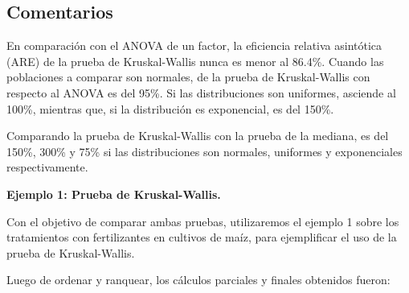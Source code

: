 \documentclass[]{book}
\theoremstyle{definition}
\theoremstyle{definition}
\theoremstyle{definition}
\theoremstyle{remark}
\begin{document}
\hypertarget{comentarios-3}{%
\subsection{Comentarios}\label{comentarios-3}}

En comparación con el ANOVA de un factor, la eficiencia relativa
asintótica (ARE) de la prueba de Kruskal-Wallis nunca es menor al
86.4\%. Cuando las poblaciones a comparar son normales, de la prueba de
Kruskal-Wallis con respecto al ANOVA es del 95\%. Si las distribuciones
son uniformes, asciende al 100\%, mientras que, si la distribución es
exponencial, es del 150\%.

Comparando la prueba de Kruskal-Wallis con la prueba de la mediana, es
del 150\%, 300\% y 75\% si las distribuciones son normales, uniformes y
exponenciales respectivamente.

\textbf{Ejemplo 1: Prueba de Kruskal-Wallis. }

Con el objetivo de comparar ambas pruebas, utilizaremos el ejemplo 1
sobre los tratamientos con fertilizantes en cultivos de maíz, para
ejemplificar el uso de la prueba de Kruskal-Wallis.

Luego de ordenar y ranquear, los cálculos parciales y finales obtenidos
fueron:
\end{document}
